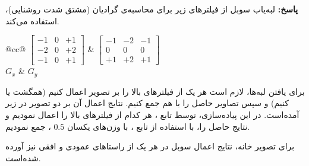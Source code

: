 \documentclass[12pt,a4paper]{article}
\theoremstyle{definition}
\theoremstyle{theorem}
\theoremstyle{definition}
\begin{document}
\textbf{پاسخ: }
لبه‌یاب سوبل از فیلترهای زیر برای محاسبه‌ی گرادیان (مشتق شدت روشنایی)، استفاده می‌کند.

\begin{center}
\begin{tabular}{@{}cc@{}}
\vspace{0.2cm}
{
\(
\left[ \begin{array}{ccc}
-1 & 0 & +1 \\
-2 & 0 & +2 \\
-1 & 0 & +1 \end{array} \right]
\)} 
\hspace{1cm}
& 
{\(
\left[ \begin{array}{ccc}
-1 & -2 & -1 \\
0 & 0 & 0 \\
+1 & +2 & +1 \end{array} \right]
\)} \\
\small \textbf{ \( G_x \) } 
\hspace{1cm}
&
\small \textbf{ \( G_y \) } 
\end{tabular}
\end{center}

برای یافتن لبه‌ها، لازم است هر یک از فیلترهای بالا را بر تصویر اعمال کنیم (همگشت یا  کنیم) و سپس تصاویر حاصل را با هم جمع کنیم. نتایج اعمال آن بر دو تصویر در زیر آمده‌است. 
در این پیاده‌سازی، توسط تابع 
، هر کدام از فیلتر‌های بالا را اعمال نمودیم و نتایج حاصل را، با استفاده از تابع 
، با وزن‌های یکسان \( 0.5 \) ، جمع نمودیم.

برای تصویر خانه، نتایج اعمال سوبل در هر یک از راستاهای عمودی و افقی نیز آورده شده‌است.
\end{document}
